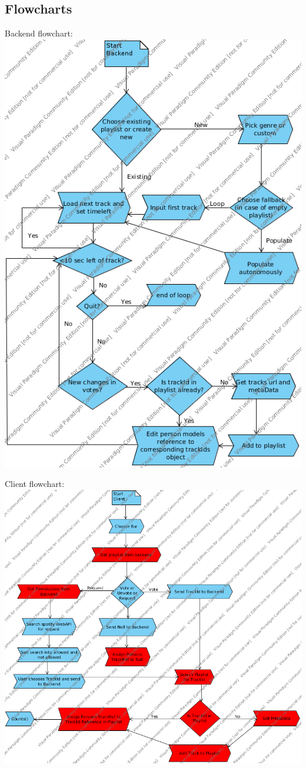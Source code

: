 \subsection{Flowcharts}

Backend flowchart:
\includegraphics{Images/backendFlowchart.png}

Client flowchart:
\includegraphics{Images/clientFlowchart.png}